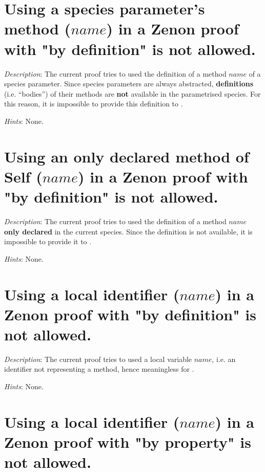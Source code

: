 \section*{Using a species parameter's method ($name$) in a Zenon proof
  with "by definition" is not allowed.}

{\em Description}: The current proof tries to used the definition of a
method $name$ of a species parameter. Since species parameters are
always abstracted, {\bf definitions} (i.e. ``bodies'') of their methods
are {\bf not} available in the parametrised species. For this reason,
it is impossible to provide this definition to \zenon.

{\em Hints}: None.



\section*{Using an only declared method of Self ($name$) in a Zenon
  proof with "by definition" is not allowed.}

{\em Description}: The current proof tries to used the definition of a
method $name$ {\bf only declared} in the current species. Since the
definition is not available, it is impossible to provide it to
\zenon.

{\em Hints}: None.



\section*{Using a local identifier ($name$) in a Zenon proof with "by
  definition" is not allowed.}

{\em Description}: The current proof tries to used a local variable
$name$, i.e. an identifier not representing a method, hence
meaningless for \zenon.

{\em Hints}: None.



\section*{Using a local identifier ($name$) in a Zenon proof with "by
  property" is not allowed.}

